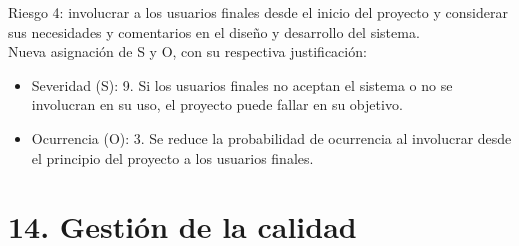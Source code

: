 \documentclass[
11pt, %
]{charter}
\begin{document}
Riesgo 4: involucrar a los usuarios finales desde el inicio del proyecto y considerar sus necesidades y comentarios en el diseño y desarrollo del sistema.\\
  Nueva asignación de S y O, con su respectiva justificación:
\begin{itemize}
  \item Severidad (S): 9. Si los usuarios finales no aceptan el sistema o no se involucran en su uso, el proyecto puede fallar en su objetivo.
  \item Ocurrencia (O): 3. Se reduce la probabilidad de ocurrencia al involucrar desde el principio del proyecto a los usuarios finales. 
\end{itemize}

\section{14. Gestión de la calidad}
\label{sec:calidad}
\end{document}
